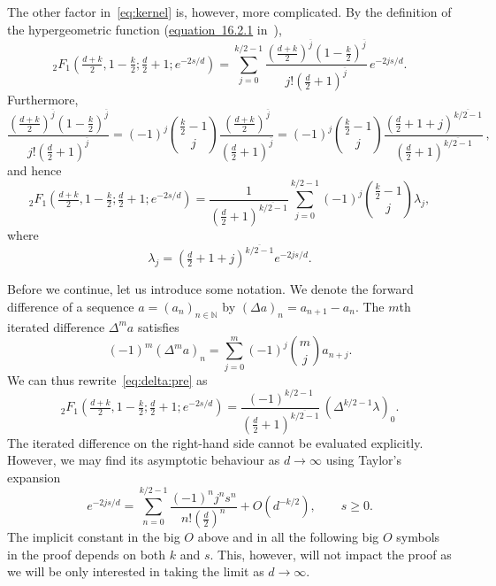 \documentclass[a4paper,12pt,reqno]{amsart}
\numberwithin{equation}{section}
\theoremstyle{definition}
\newcommand{\N}{\mathbb{N}}
\renewcommand{\ge}{\geqslant}
\begin{document}
The other factor in~\eqref{eq:kernel} is, however, more complicated. By the definition of the hypergeometric function (\href{https://dlmf.nist.gov/16.2#E1}{equation~16.2.1} in~\cite{dlmf}),
\[
 {_2F_1}(\tfrac{d + k}{2}, 1 - \tfrac{k}{2}; \tfrac{d}{2} + 1; e^{-2 s / d}) = \sum_{j = 0}^{k / 2 - 1} \frac{(\frac{d + k}{2})^{\overline{j}} (1 - \frac{k}{2})^{\overline{j}}}{j! (\tfrac{d}{2} + 1)^{\overline{j}}} \, e^{-2 j s / d} .
\]
Furthermore,
\[
 \frac{(\frac{d + k}{2})^{\overline{j}} (1 - \frac{k}{2})^{\overline{j}}}{j! (\tfrac{d}{2} + 1)^{\overline{j}}} = (-1)^j \binom{\frac{k}{2} - 1}{j} \frac{(\frac{d + k}{2})^{\overline{j}}}{(\tfrac{d}{2} + 1)^{\overline{j}}} = (-1)^j \binom{\frac{k}{2} - 1}{j} \frac{(\frac{d}{2} + 1 + j)^{\overline{k / 2 - 1}}}{(\tfrac{d}{2} + 1)^{\overline{k / 2 - 1}}} \, ,
\]
and hence
\begin{equation}
\label{eq:delta:pre}
 {_2F_1}(\tfrac{d + k}{2}, 1 - \tfrac{k}{2}; \tfrac{d}{2} + 1; e^{-2 s / d}) = \frac{1}{(\tfrac{d}{2} + 1)^{\overline{k / 2 - 1}}} \sum_{j = 0}^{k / 2 - 1} (-1)^j \binom{\frac{k}{2} - 1}{j} \lambda_j ,
\end{equation}
where
\[
 \lambda_j = (\tfrac{d}{2} + 1 + j)^{\overline{k / 2 - 1}} e^{-2 j s / d} .
\]

Before we continue, let us introduce some notation. We denote the forward difference of a sequence $a=(a_n)_{n\in \N}$ by $(\Delta a)_n = a_{n + 1} - a_n$. The $m$th iterated difference $\Delta^m a$ satisfies
\[
 (-1)^m (\Delta^m a)_n = \sum_{j = 0}^m (-1)^j \binom{m}{j} a_{n + j} .
\]
We can thus rewrite~\eqref{eq:delta:pre} as
\begin{equation}
\label{eq:delta}
 {_2F_1}(\tfrac{d + k}{2}, 1 - \tfrac{k}{2}; \tfrac{d}{2} + 1; e^{-2 s / d}) = \frac{(-1)^{k / 2 - 1}}{(\tfrac{d}{2} + 1)^{\overline{k / 2 - 1}}} \, (\Delta^{k / 2 - 1} \lambda)_0 .
\end{equation}
The iterated difference on the right-hand side cannot be evaluated explicitly. However, we may find its asymptotic behaviour as $d \to \infty$ using Taylor's expansion
\[
 e^{-2 j s / d} = \sum_{n = 0}^{k / 2 - 1} \frac{(-1)^n j^n s^n}{n! (\frac{d}{2})^n} + O(d^{-k / 2}),\qquad s\ge 0.
\]
The implicit constant in the big $O$ above and in all the following big $O$ symbols in the proof depends on both $k$ and $s.$ This, however, will not impact the proof as we will be only interested in taking the limit as $d\to \infty.$
\end{document}
